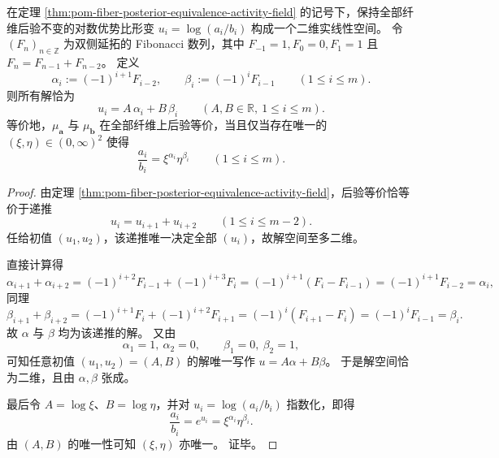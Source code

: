 \begin{corollary}\label{cor:pom-fiber-posterior-equivalence-fibonacci-gauge}
在定理 \ref{thm:pom-fiber-posterior-equivalence-activity-field} 的记号下，保持全部纤维后验不变的对数优势比形变
\(
u_i=\log(a_i/b_i)
\)
构成一个二维实线性空间。
令 \((F_n)_{n\in\mathbb Z}\) 为双侧延拓的 Fibonacci 数列，其中
\(
F_{-1}=1,F_0=0,F_1=1
\)
且
\(
F_n=F_{n-1}+F_{n-2}
\)。
定义
\[
\alpha_i:=(-1)^{i+1}F_{i-2},
\qquad
\beta_i:=(-1)^iF_{i-1}
\qquad(1\le i\le m).
\]
则所有解恰为
\[
u_i=A\,\alpha_i+B\,\beta_i
\qquad(A,B\in\mathbb R,\ 1\le i\le m).
\]
等价地，\(\mu_{\boldsymbol a}\) 与 \(\mu_{\boldsymbol b}\) 在全部纤维上后验等价，当且仅当存在唯一的
\(
(\xi,\eta)\in(0,\infty)^2
\)
使得
\[
\frac{a_i}{b_i}=\xi^{\alpha_i}\eta^{\beta_i}
\qquad(1\le i\le m).
\]
\end{corollary}
\begin{proof}
由定理 \ref{thm:pom-fiber-posterior-equivalence-activity-field}，后验等价恰等价于递推
\[
u_i=u_{i+1}+u_{i+2}\qquad(1\le i\le m-2).
\]
任给初值 \((u_1,u_2)\)，该递推唯一决定全部 \((u_i)\)，故解空间至多二维。

直接计算得
\[
\alpha_{i+1}+\alpha_{i+2}
=(-1)^{i+2}F_{i-1}+(-1)^{i+3}F_i
=(-1)^{i+1}(F_i-F_{i-1})
=(-1)^{i+1}F_{i-2}
=\alpha_i,
\]
同理
\[
\beta_{i+1}+\beta_{i+2}
=(-1)^{i+1}F_i+(-1)^{i+2}F_{i+1}
=(-1)^i(F_{i+1}-F_i)
=(-1)^iF_{i-1}
=\beta_i.
\]
故 \(\alpha\) 与 \(\beta\) 均为该递推的解。
又由
\[
\alpha_1=1,\ \alpha_2=0,\qquad
\beta_1=0,\ \beta_2=1,
\]
可知任意初值 \((u_1,u_2)=(A,B)\) 的解唯一写作
\(
u=A\alpha+B\beta
\)。
于是解空间恰为二维，且由 \(\alpha,\beta\) 张成。

最后令 \(A=\log\xi\)、\(B=\log\eta\)，并对
\(
u_i=\log(a_i/b_i)
\)
指数化，即得
\[
\frac{a_i}{b_i}=e^{u_i}=\xi^{\alpha_i}\eta^{\beta_i}.
\]
由 \((A,B)\) 的唯一性可知 \((\xi,\eta)\) 亦唯一。
证毕。
\end{proof}

